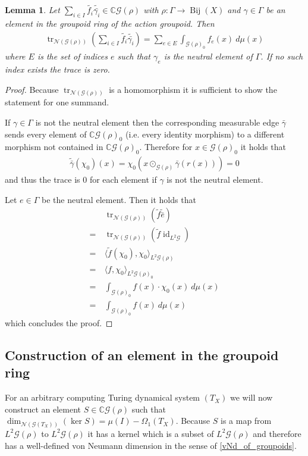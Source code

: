 \documentclass[12pt,a4paper]{scrartcl}
\theoremstyle{plain}
\newtheorem{Lemma}[Theorem]{Lemma}
\theoremstyle{definition}
\newcommand{\C}{\mathbb{C}} %
\newcommand{\2}{\mathbb{Z} / 2 \mathbb{Z}}
\newcommand{\G}{\mathcal{G}}
\newcommand{\1}{\bar{1}}
\newcommand{\0}{\bar{0}}
\newcommand{\Bij}{\operatorname{Bij}}
\newcommand{\tr}{\operatorname{tr}}
\newcommand{\id}{\operatorname{id}}
\begin{document}
\begin{Lemma} \label{trgroupoid}
	Let $\sum_{i \in I}  \widetilde{f_i} \widetilde{\bar{\gamma_i}} \in \C\G(\rho)$ with $\rho\colon\Gamma \to \Bij(X)$ and $\gamma \in \Gamma$ be an element in the groupoid ring of the action groupoid. Then
	\begin{align*}
	\tr_{\mathcal{N}(\G(\rho))}(\sum_{i \in I} \widetilde{f_i} \widetilde{\bar{\gamma_i}} ) = \sum_{e \in E} \int_{\G(\rho)_0} f_e(x) ~ d\mu(x)
	\end{align*}
	where $E$ is the set of indices $e$ such that $\gamma_e$ is the neutral element of $\Gamma$. If no such index exists the trace is zero.
\end{Lemma}
\begin{proof} 
	Because $\tr_{\mathcal{N}(\G(\rho))}$ is a homomorphism it is sufficient to show the statement for one summand.
	
	If $\gamma \in \Gamma$ is not the neutral element then the corresponding measurable edge $\bar{\gamma}$ sends every element of $\C\G(\rho)_0$ (i.e. every identity morphism) to a different morphism not contained in $\C\G(\rho)_0$. Therefore for $x \in \G(\rho)_0$ it holds that
	\begin{align*}
		\widetilde{\bar{\gamma}}(\chi_0)(x) = \chi_0(x \odot_{\G(\rho)} \bar{\gamma}(r(x))) = 0
	\end{align*}
	and thus the trace is $0$ for each element if $\gamma$ is not the neutral element.
	
	Let $e \in \Gamma$ be the neutral element. Then it holds that
	\begin{align*}
	&~ \tr_{\mathcal{N}(\G(\rho))}(\tilde{f} \widetilde{\bar{e}} ) \\
	=&~ \tr_{\mathcal{N}(\G(\rho))}(\tilde{f} \id_{L^2 \G} ) \\
	=&~ \langle \tilde{f} (\chi_0), \chi_0 \rangle_{L^2 \G(\rho)} \\
	=&~ \langle f, \chi_0 \rangle_{L^2 \G(\rho)_0} \\
	=&~ \int_{\G(\rho)_0} f(x) \cdot \chi_0(x) ~ d\mu(x) \\
	=&~ \int_{\G(\rho)_0} f(x) ~ d\mu(x)
	\end{align*}
	which concludes the proof.
\end{proof}


\subsection{Construction of an element in the groupoid ring}
For an arbitrary computing Turing dynamical system $(T_X)$ we will now construct an element $S \in \C \G (\rho)$ such that $\dim_{\mathcal{N}(\G(T_X))}(\ker S) = \mu(I) - \Omega_1(T_X)$. Because $S$ is a map from $L^2 \G (\rho)$ to $L^2 \G (\rho)$ it has a kernel which is a subset of $L^2 \G (\rho)$ and therefore has a well-defined von Neumann dimension in the sense of \ref{vNd_of_groupoids}.
\end{document}
